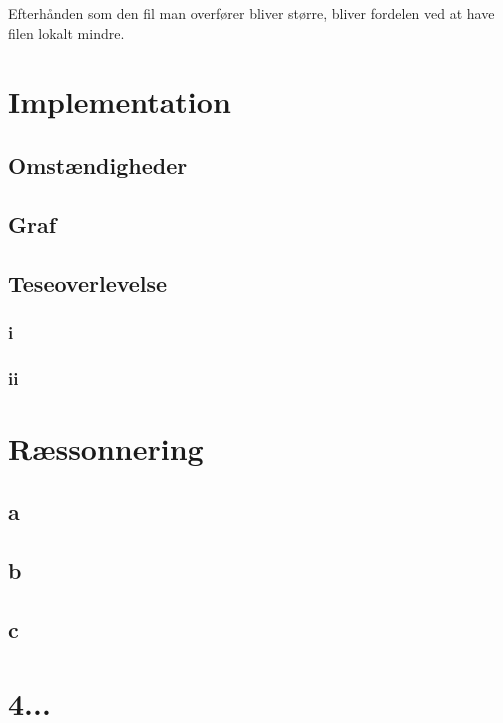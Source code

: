 \documentclass{article}
\begin{document}
Efterhånden som den fil man overfører bliver større, bliver fordelen ved at have filen lokalt mindre.

\section{Implementation}

\subsection{Omstændigheder}

\subsection{Graf}

\subsection{Teseoverlevelse}

\subsubsection{i}

\subsubsection{ii}

\section{Ræssonnering}

\subsection{a}
\subsection{b}
\subsection{c}

\section{4...}
\end{document}

